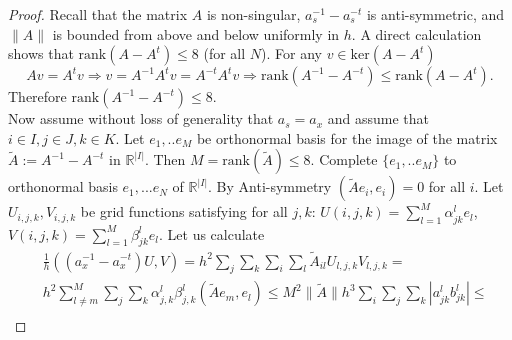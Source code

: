 \documentclass[12pt,reqno]{amsart}
\newcommand{\R}{\mathbb{R}}
\newcommand{\e}{{\bf E}}
\theoremstyle{definition}
\numberwithin{equation}{section}
\def\Gwh{\Omega_h}
\begin{document}
\begin{proof}
	Recall that the matrix  $A$ is non-singular,  $a_s^{-1}-a_s^{-t}$ is anti-symmetric, and $\|A\|$  is bounded from above and below  uniformly in $h$. 
	A direct calculation shows that 
	$\mathrm{rank}(A-A^t)\leq 8$ (for all $N$). For any $v\in \mathrm{ker}(A-A^t)$
	$$
	Av=A^tv \Rightarrow v=A^{-1}A^{t}v=A^{-t}A^{t}v\Rightarrow
	\mathrm{rank}(A^{-1}-A^{-t})\leq 	\mathrm{rank}(A-A^t).
	$$
	Therefore $\mathrm{rank}(A^{-1}-A^{-t})\leq 8$.\\
	Now assume without loss of generality that $a_s=a_x$ and assume that 
	$i\in I, j\in J, k\in K$.
% 
 Let $e_1,..e_M$  be orthonormal basis for the image of the matrix  $\tilde{A}:=A^{-1}-A^{-t}$ in $\R^{|I|}$.
 Then $M=\mathrm{rank}(\tilde{A})\leq 8$.
 Complete $\{e_1,..e_M\}$ to orthonormal  basis $e_1,...e_N$ of $\R^{|I|}$.
By Anti-symmetry  $(\tilde{A}e_i,e_i)=0$ for all $i$.
  Let $U_{i,j,k}, V_{i,j,k}$ be grid functions satisfying for all $j,k$:
  $U(i,j,k)=\sum_{l=1}^M \alpha_{jk}^{l}e_l$, $V(i,j,k)=\sum_{l=1}^M \beta_{jk}^{l}e_l$.
Let us calculate
  \begin{align*}
  	&
 \frac{1}{h}((a_x^{-1}-a_x^{-t})U,V)=h^2 \sum_j\sum_k\sum_i\sum_l \tilde{A}_{il}U_{l,j,k}V_{l,j,k}=\\&
 h^2\sum_{l\neq m}^M\sum_j\sum_k\alpha_{j,k}^l\beta_{j,k}^l(\tilde{A}e_m,e_l)\leq 
 M^2\|\tilde{A}\|h^3\sum_{i}\sum_j\sum_k |a_{jk}^lb_{jk}^l|\leq \\&

\end{align*}
\end{proof}
\end{document}
